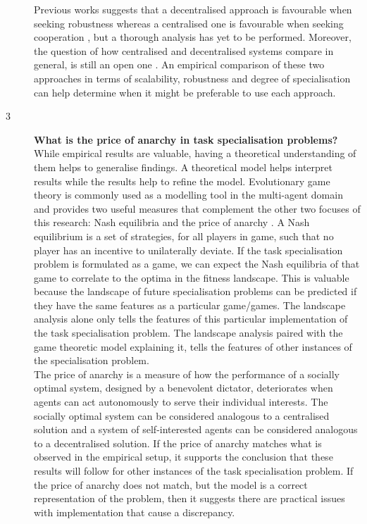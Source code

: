 \documentclass[12pt]{article}
\begin{document}
\begin{description}
Previous works suggests that a decentralised approach is favourable when seeking robustness whereas a centralised one is favourable when seeking cooperation \cite{wiegand:GECCO:2006}, but a thorough analysis has yet to be performed. 
Moreover, the question of how centralised and decentralised systems compare in general, is still an open one \cite{vanLon:AAMAS:2017}.
An empirical comparison of these two approaches in terms of scalability, robustness and degree of specialisation can help determine when it might be preferable to use each approach.

\item[3] \textbf{What is the price of anarchy in task specialisation problems?}\\

While empirical results are valuable, having a theoretical understanding of them helps to generalise findings.
A theoretical model helps interpret results while the results help to refine the model.
Evolutionary game theory is commonly used as a modelling tool in the multi-agent domain \cite{panait:AAMAS:2005, wiegand:GECCO:2006, lanctot:NeurIPS:2017} and provides two useful measures that complement the other two focuses of this research: Nash equilibria \cite{hofbauer:BAMS:2003} and the price of anarchy \cite{koutsoupias:ASTACS:1999}.
A Nash equilibrium is a set of strategies, for all players in game, such that no player has an incentive to unilaterally deviate.
If the task specialisation problem is formulated as a game, we can expect the Nash equilibria of that game to correlate to the optima in the fitness landscape.
This is valuable because the landscape of future specialisation problems can be predicted if they have the same features as a particular game/games.
The landscape analysis alone only tells the features of this particular implementation of the task specialisation problem.
The landscape analysis paired with the game theoretic model explaining it, tells the features of other instances of the specialisation problem.\\

The price of anarchy is a measure of how the performance of a socially optimal system, designed by a benevolent dictator, deteriorates when agents can act autonomously to serve their individual interests.
The socially optimal system can be considered analogous to a centralised solution and a system of self-interested agents can be considered analogous to a decentralised solution.
If the price of anarchy matches what is observed in the empirical setup, it supports the conclusion that these results will follow for other instances of the task specialisation problem.
If the price of anarchy does not match, but the model is a correct representation of the problem, then it suggests there are practical issues with implementation that cause a discrepancy.

\end{description}
\end{document}
